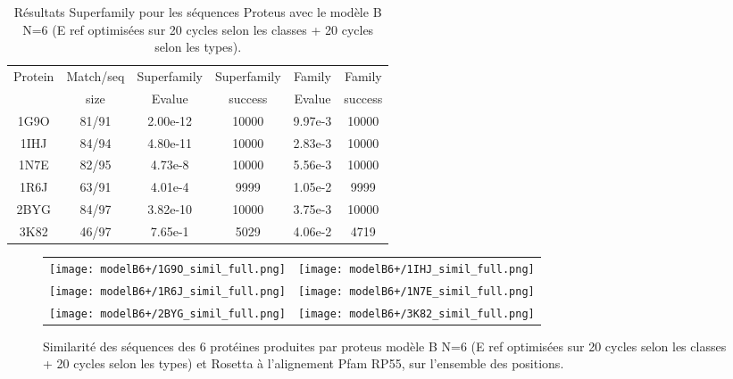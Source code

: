    \clearpage
\begin{table}[h]
  \raggedleft{}
  
  \begin{tabular}{cccccc}
    
    \toprule
    Protein & Match/seq & Superfamily & Superfamily & Family & Family \\
            & size      & Evalue      & success     & Evalue & success\\
    \cmidrule{1-6}
    1G9O  & 81/91 &  2.00e-12 & 10000  & 9.97e-3 & 10000  \\
    1IHJ  & 84/94 &  4.80e-11 & 10000  & 2.83e-3 & 10000  \\
    1N7E  & 82/95 &  4.73e-8  & 10000  & 5.56e-3 & 10000  \\
    1R6J  & 63/91 &  4.01e-4  &  9999  & 1.05e-2 &  9999  \\
    2BYG  & 84/97 &  3.82e-10 & 10000  & 3.75e-3 & 10000  \\
    3K82  & 46/97 &  7.65e-1  &  5029  & 4.06e-2 &  4719  \\

    \bottomrule        
  \end{tabular}   
  \caption{Résultats Superfamily pour les séquences Proteus avec le modèle B N=6 (E ref optimisées sur 20 cycles selon les classes + 20 cycles selon les types).}   
  \label{tab:superfamily_model_B6}       
\end{table}
   

    \clearpage
    \thispagestyle{empty}
   \begin{figure}[t]
     \centering
     \begin{tabular}{cc} 
       \texttt{[image: modelB6+/1G9O\_simil\_full.png]} &
       \texttt{[image: modelB6+/1IHJ\_simil\_full.png]} \\
       \texttt{[image: modelB6+/1R6J\_simil\_full.png]} &
       \texttt{[image: modelB6+/1N7E\_simil\_full.png]} \\
       \texttt{[image: modelB6+/2BYG\_simil\_full.png]} &
       \texttt{[image: modelB6+/3K82\_simil\_full.png]} \\
     \end{tabular}
  \caption{Similarité des séquences des 6 protéines produites par proteus modèle B N=6 (E ref optimisées sur 20 cycles selon les classes + 20 cycles selon les types) et Rosetta à l'alignement Pfam RP55, sur l'ensemble des positions.}

\label{graph:Simil_modeB6+_core}


   \end{figure}



